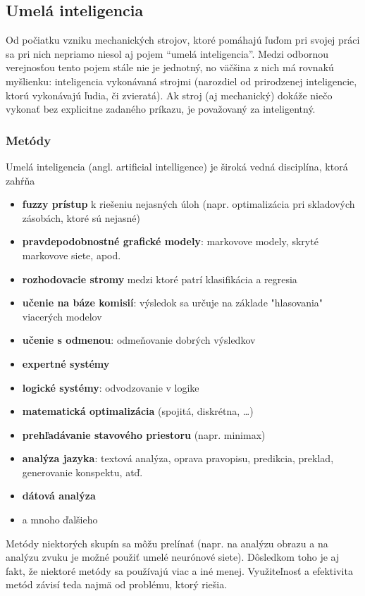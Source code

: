\subsection{Umelá inteligencia}\label{subsec:ai}

Od počiatku vzniku mechanických strojov, ktoré pomáhajú ľuďom pri svojej práci sa pri nich nepriamo niesol aj pojem
\enquote{umelá inteligencia}.
Medzi odbornou verejnosťou tento pojem stále nie je jednotný, no väčšina z nich má rovnakú myšlienku:
inteligencia vykonávaná strojmi (narozdiel od prirodzenej inteligencie, ktorú vykonávajú ľudia, či
zvieratá).\cite{ai_definition}
Ak stroj (aj mechanický) dokáže niečo vykonať bez explicitne zadaného príkazu, je považovaný za inteligentný.

\subsubsection{Metódy}

Umelá inteligencia (angl. artificial intelligence) je široká vedná disciplína, ktorá zahŕňa\cite{ai_methods}
\begin{itemize}
    \item \textbf{fuzzy prístup} k riešeniu nejasných úloh (napr. optimalizácia pri skladových zásobách, ktoré sú nejasné)
    \item \textbf{pravdepodobnostné grafické modely}: markovove modely, skryté markovove siete, apod.
    \item \textbf{rozhodovacie stromy} medzi ktoré patrí klasifikácia a regresia
    \item \textbf{učenie na báze komisií}: výsledok sa určuje na základe "hlasovania" viacerých modelov
    \item \textbf{učenie s odmenou}: odmeňovanie dobrých výsledkov
    \item \textbf{expertné systémy}
    \item \textbf{logické systémy}: odvodzovanie v logike
    \item \textbf{matematická optimalizácia} (spojitá, diskrétna, \dots)
    \item \textbf{prehľadávanie stavového priestoru} (napr. minimax)
    \item \textbf{analýza jazyka}: textová analýza, oprava pravopisu, predikcia, preklad, generovanie konspektu, atď.
    \item \textbf{dátová analýza}
    \item a mnoho ďalšieho
\end{itemize}
Metódy niektorých skupín sa môžu prelínať (napr. na analýzu obrazu a na analýzu zvuku je možné použiť umelé neurónové
siete).\cite{ai_ann_sound,ai_ann_image}
Dôsledkom toho je aj fakt, že niektoré metódy sa používajú viac a iné menej.
Využiteľnosť a efektivita metód závisí teda najmä od problému, ktorý riešia.

